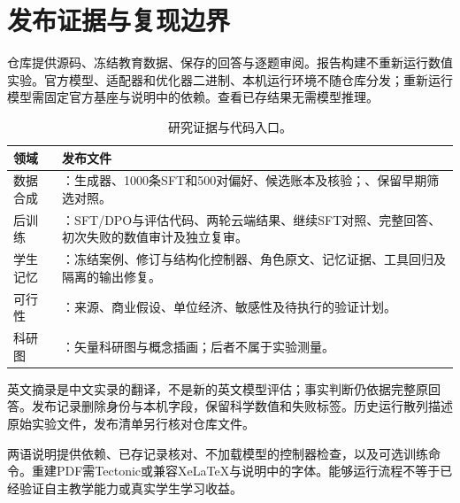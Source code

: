 \section{发布证据与复现边界}
仓库提供源码、冻结教育数据、保存的回答与逐题审阅。报告构建不重新运行数值实验。官方模型、适配器和优化器二进制、本机运行环境不随仓库分发；重新运行模型需固定官方基座与说明中的依赖。查看已存结果无需模型推理。
\begin{table}[htbp]\centering\small
\caption{研究证据与代码入口。}
\begin{tabularx}{\linewidth}{@{}p{27mm}Y@{}}\toprule
领域 & 发布文件\\\midrule
数据合成 & ：生成器、1000条SFT和500对偏好、候选账本及核验；、保留早期筛选对照。\\
后训练 & ：SFT/DPO与评估代码、两轮云端结果、继续SFT对照、完整回答、初次失败的数值审计及独立复审。\\
学生记忆 & ：冻结案例、修订与结构化控制器、角色原文、记忆证据、工具回归及隔离的输出修复。\\
可行性 & ：来源、商业假设、单位经济、敏感性及待执行的验证计划。\\
科研图 & ：矢量科研图与概念插画；后者不属于实验测量。\\\bottomrule
\end{tabularx}\end{table}\FloatBarrier
英文摘录是中文实录的翻译，不是新的英文模型评估；事实判断仍依据完整原回答。发布记录删除身份与本机字段，保留科学数值和失败标签。历史运行散列描述原始实验文件，发布清单另行核对仓库文件。

两语说明提供依赖、已存记录核对、不加载模型的控制器检查，以及可选训练命令。重建PDF需Tectonic或兼容XeLaTeX与说明中的字体。能够运行流程不等于已经验证自主教学能力或真实学生学习收益。
